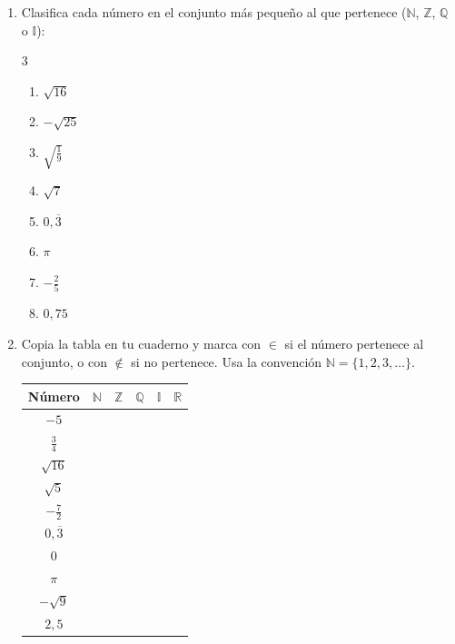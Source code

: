 \documentclass[12pt, letterpaper]{article}
\begin{document}
\begin{enumerate}[leftmargin=*, resume]
  \item \facil{} Clasifica cada número en el conjunto más pequeño al que pertenece ($\mathbb{N}$, $\mathbb{Z}$, $\mathbb{Q}$ o $\mathbb{I}$):
        \begin{multicols}{3}
          \begin{enumerate}[label=\alph*)]
            \item $\sqrt{16}$
            \item $-\sqrt{25}$
            \item $\sqrt{\frac{1}{9}}$
            \item $\sqrt{7}$
            \item $0{,}\overline{3}$
            \item $\pi$
            \item $-\frac{2}{5}$
            \item $0{,}75$
          \end{enumerate}
        \end{multicols}

  \item \medio{} Copia la tabla en tu cuaderno y marca con $\in$ si el número pertenece al conjunto, o con $\notin$ si no pertenece. Usa la convención $\mathbb{N} = \{1, 2, 3, \ldots\}$.

        \begin{center}
          \renewcommand{\arraystretch}{1.6}
          \begin{tabular}{|c|c|c|c|c|c|}
            \hline
            \textbf{Número} & $\mathbb{N}$ & $\mathbb{Z}$ & $\mathbb{Q}$ & $\mathbb{I}$ & $\mathbb{R}$ \\
            \hline
            $-5$ & & & & & \\ \hline
            $\frac{3}{4}$ & & & & & \\ \hline
            $\sqrt{16}$ & & & & & \\ \hline
            $\sqrt{5}$ & & & & & \\ \hline
            $-\frac{7}{2}$ & & & & & \\ \hline
            $0{,}\overline{3}$ & & & & & \\ \hline
            $0$ & & & & & \\ \hline
            $\pi$ & & & & & \\ \hline
            $-\sqrt{9}$ & & & & & \\ \hline
            $2{,}5$ & & & & & \\ \hline
          \end{tabular}
        \end{center}


\end{enumerate}
\end{document}
